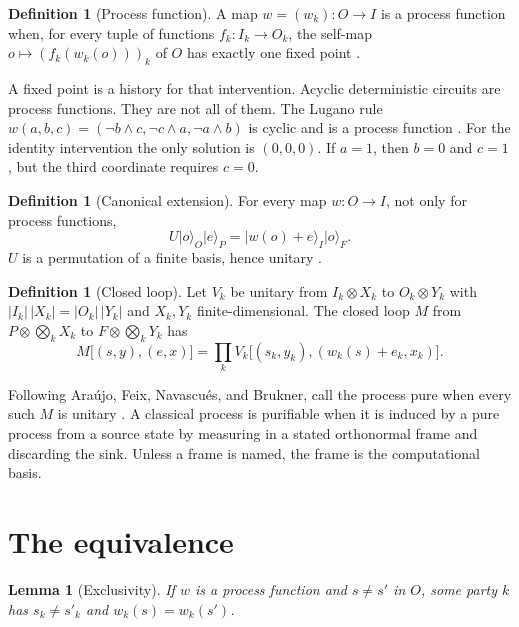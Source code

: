 \documentclass[11pt]{article}
\newtheorem{lemma}[theorem]{Lemma}
\theoremstyle{definition}
\newtheorem{definition}[theorem]{Definition}
\begin{document}
\begin{definition}[Process function]
A map \(w=(w_k):O\to I\) is a process function when, for every tuple of functions \(f_k:I_k\to O_k\), the self-map \(o\mapsto (f_k(w_k(o)))_k\) of \(O\) has exactly one fixed point \cite{baumeler2016}.
\end{definition}

A fixed point is a history for that intervention. Acyclic deterministic circuits are process functions. They are not all of them. The Lugano rule \(w(a,b,c)=(\lnot b\land c,\lnot c\land a,\lnot a\land b)\) is cyclic and is a process function \cite{baumeler2016,araujo2017}. For the identity intervention the only solution is \((0,0,0)\). If \(a=1\), then \(b=0\) and \(c=1\), but the third coordinate requires \(c=0\).

\begin{definition}[Canonical extension]
For every map \(w:O\to I\), not only for process functions,
\begin{equation}
\label{eq:U}
U\lvert o\rangle_O\lvert e\rangle_P=\lvert w(o)+e\rangle_I\lvert o\rangle_F.
\end{equation}
\(U\) is a permutation of a finite basis, hence unitary \cite{baumeler2019}.
\end{definition}

\begin{definition}[Closed loop]
Let \(V_k\) be unitary from \(I_k\otimes X_k\) to \(O_k\otimes Y_k\) with \(|I_k|\,|X_k|=|O_k|\,|Y_k|\) and \(X_k,Y_k\) finite-dimensional. The closed loop \(M\) from \(P\otimes\bigotimes_k X_k\) to \(F\otimes\bigotimes_k Y_k\) has
\begin{equation}
\label{eq:M}
M\bigl[(s,y),(e,x)\bigr]
=\prod_k V_k\bigl[(s_k,y_k),(w_k(s)+e_k,x_k)\bigr].
\end{equation}
\end{definition}

Following Ara\'ujo, Feix, Navascu\'es, and Brukner, call the process pure when every such \(M\) is unitary \cite{araujo2017}. A classical process is purifiable when it is induced by a pure process from a source state by measuring in a stated orthonormal frame and discarding the sink. Unless a frame is named, the frame is the computational basis.

\section{The equivalence}
\label{sec:eq}

\begin{lemma}[Exclusivity]
\label{lem:ex}
If \(w\) is a process function and \(s\neq s'\) in \(O\), some party \(k\) has \(s_k\neq s'_k\) and \(w_k(s)=w_k(s')\).
\end{lemma}
\end{document}
